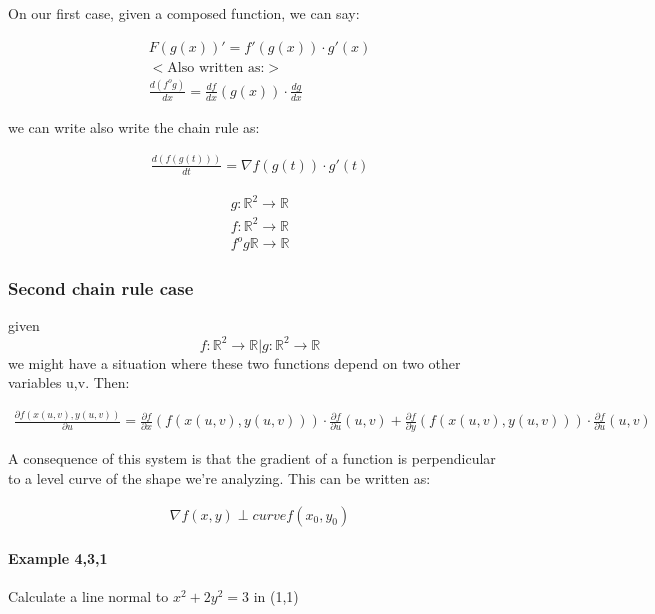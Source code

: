 \documentclass[11pt,fleqn]{book} %
\begin{document}
On our first case, given a composed function, we can say:

\begin{gather}
    F(g(x))' = f'(g(x))\cdot g'(x)\\ <\text{Also written as:}> \\
    \frac{d(f^og)}{dx} = \frac{df}{dx}(g(x)) \cdot \frac{dg}{dx}
\end{gather}

we can write also write the chain rule as:

\begin{gather}
    \frac{d(f(g(t)))}{dt} = \nabla f(g(t)) \cdot g'(t)
\end{gather}

\begin{gather}
    g: \mathbb{R}^2 \to \mathbb{R}\\
    f: \mathbb{R}^2 \to \mathbb{R}\\
    f^o g \mathbb{R} \to \mathbb{R}
\end{gather}

\subsubsection{Second chain rule case}

given $$f: \mathbb{R}^2 \to \mathbb{R} | g: \mathbb{R}^2 \to \mathbb{R}$$
we might have a situation where these two functions depend on two other variables u,v. Then:

\begin{gather}
    \frac{\partial f(x(u,v), y(u,v))}{\partial u} = \frac{\partial f}{\partial x} (f(x(u,v), y(u,v))) \cdot \frac{\partial f}{\partial u} (u,v) + \frac{\partial f}{\partial y} (f(x(u,v), y(u,v))) \cdot \frac{\partial f}{\partial u} (u,v)
\end{gather}

A consequence of this system is that the gradient of a function is perpendicular to a 
level curve of the shape we're analyzing. This can be written as:

\begin{gather}
    \nabla f(x,y) \perp curve f(x_0,y_0) 
\end{gather}

\paragraph{Example 4,3,1}

Calculate a line normal to $x^2 + 2y^2 = 3$ in (1,1)
\end{document}
